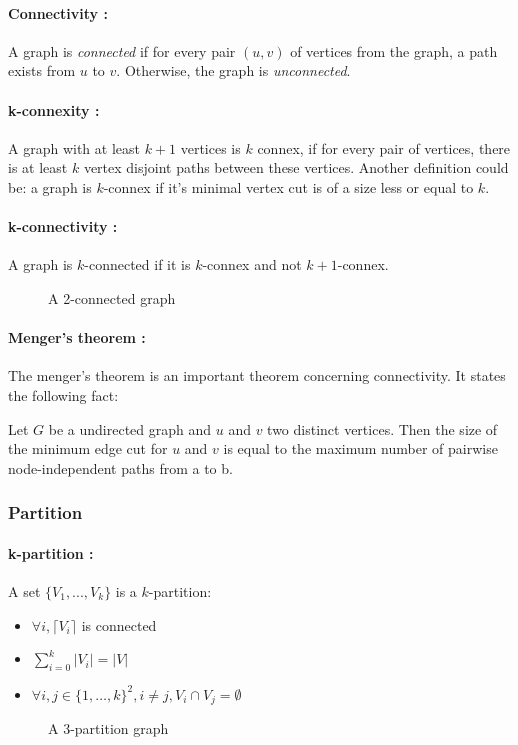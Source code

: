 \paragraph{Connectivity :}\label{defConnectivity}
A graph is {\em connected} if for every pair $(u,v)$ of vertices from the
graph, a path exists from $u$ to $v$. Otherwise, the graph is {\em unconnected}.

\paragraph{k-connexity :}
A graph with at least $k+1$ vertices is $k$ connex, if for every pair of
vertices, there is at least $k$ vertex disjoint paths between these vertices.
Another definition could be: a graph is $k$-connex if it's minimal vertex cut
is of a size less or equal to $k$.

\paragraph{k-connectivity :}
A graph is $k$-connected if it is $k$-connex and not $k+1$-connex. 

\begin{figure}[!h]
  \begin{center}
    
  \end{center}
  \caption{A 2-connected graph}
\end{figure}

\paragraph{Menger's theorem :}
The menger's theorem is an important theorem concerning connectivity.
It states the following fact:

Let $G$ be a undirected graph and $u$ and $v$ two distinct vertices.
Then the size of the minimum edge cut for $u$ and $v$ is equal to the maximum
number of pairwise node-independent paths from a to b.


\subsubsection{Partition}
\paragraph{k-partition :}
A set $\{V_1,...,V_k\}$ is a $k$-partition:
\begin{itemize}
    \item $\forall i, \lceil V_i \rceil$ is connected
    \item $\sum\limits_{i=0}^k|V_i| = |V|$
    \item $\forall i,j \in \{1, \dots, k\}^2, i \neq j, V_i \cap V_j = \emptyset$
\end{itemize}

\begin{figure}[!h]
    \begin{center}
        
    \end{center}
    \caption{A 3-partition graph}
\end{figure}

